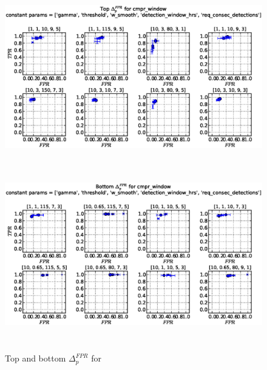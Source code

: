 \begin{figure}[!h]
\begin{center}
\includegraphics[height=3in]{../fig/final/top_fpr/cmpr_window}
\includegraphics[height=3in]{../fig/final/bottom_fpr/cmpr_window}
\end{center}
\caption{\label{fig:delta_top_bottom2f} Top and bottom $\Delta_p^{FPR}$ for }
\end{figure}

